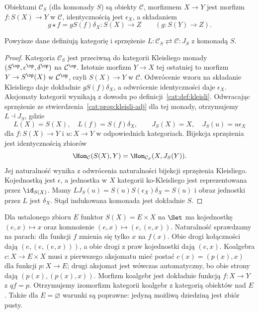 \begin{definicja}\label{cat:def:cokleisli}
Obiektami $\mathcal C_S$ (dla komonady $S$) są obiekty $\mathcal C$, morfizmem $X\to Y$ jest morfizm $f:S(X)\to Y$ w $\mathcal C$, identycznością jest $\epsilon_X$, a składaniem
\[
 g\star f=g S(f)\delta_X:S(X)\to Z
 \qquad(g:S(Y)\to Z).
\]
\end{definicja}
\begin{stwierdzenie}\label{cat:prop:cokleisli-adj}
Powyższe dane definiują kategorię i sprzężenie $L:\mathcal C_S\rightleftarrows\mathcal C:J_S$ z komonadą $S$.
\end{stwierdzenie}
\begin{proof}
Kategoria $\mathcal C_S$ jest przeciwną do kategorii Kleisliego monady $(S^{\op},\epsilon^{\op},\delta^{\op})$ na $\mathcal C^{\op}$. Istotnie morfizm $Y\to X$ tej ostatniej to morfizm $Y\to S^{\op}(X)$ w $\mathcal C^{\op}$, czyli $S(X)\to Y$ w $\mathcal C$. Odwrócenie wzoru na składanie Kleisliego daje dokładnie $gS(f)\delta_X$, a odwrócenie identyczności daje $\epsilon_X$. Aksjomaty kategorii wynikają z dowodu po definicji~\ref{cat:def:kleisli}. Odwracając sprzężenie ze stwierdzenia~\ref{cat:prop:kleisli-adj} dla tej monady, otrzymujemy $L\dashv J_S$, gdzie
\[
 L(X)=S(X),\quad L(f)=S(f)\delta_X,\qquad
 J_S(X)=X,\quad J_S(u)=u\epsilon_X
\]
dla $f:S(X)\to Y$ i $u:X\to Y$ w odpowiednich kategoriach. Bijekcja sprzężenia jest identycznością zbiorów
\[
 \Hom_{\mathcal C}(S(X),Y)=\Hom_{\mathcal C_S}(X,J_S(Y)).
\]
Jej naturalność wynika z odwrócenia naturalności bijekcji sprzężenia Kleisliego. Kojednostką jest $\epsilon$, a jednostka w $X$ kategorii ko-Kleisliego jest reprezentowana przez $\id_{S(X)}$. Mamy $LJ_S(u)=S(u)S(\epsilon_X)\delta_X=S(u)$ i obraz jednostki przez $L$ jest $\delta_X$. Stąd indukowana komonada jest dokładnie $S$.
\end{proof}

\begin{przyklad}\label{cat:ex:product-comonad}
Dla ustalonego zbioru $E$ funktor $S(X)=E\times X$ na $\Set$ ma kojednostkę $(e,x)\mapsto x$ oraz komnożenie $(e,x)\mapsto(e,(e,x))$. Naturalność sprawdzamy na parach: dla funkcji $f$ zmienia się tylko $x$ na $f(x)$. Obie drogi kołączności dają $(e,(e,(e,x)))$, a obie drogi z praw kojednostki dają $(e,x)$. Koalgebra $c:X\to E\times X$ musi z pierwszego aksjomatu mieć postać $c(x)=(p(x),x)$ dla funkcji $p:X\to E$; drugi aksjomat jest wówczas automatyczny, bo obie strony dają $(p(x),(p(x),x))$. Morfizm koalgebr jest dokładnie funkcją $f:X\to Y$ z $qf=p$. Otrzymujemy izomorfizm kategorii koalgebr z kategorią obiektów nad $E$. Także dla $E=\varnothing$ warunki są poprawne: jedyną możliwą dziedziną jest zbiór pusty.
\end{przyklad}

